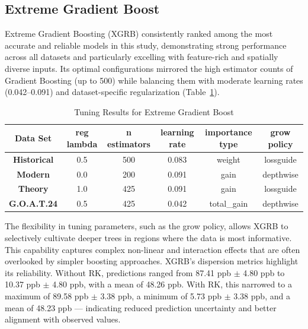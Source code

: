 \subsection{Extreme Gradient Boost} \label{rlts:xgrb} Extreme Gradient Boosting (XGRB) consistently ranked among the most accurate and reliable models in this study, demonstrating strong performance across all datasets and particularly excelling with feature-rich and spatially diverse inputs. Its optimal configurations mirrored the high estimator counts of Gradient Boosting (up to 500) while balancing them with moderate learning rates (0.042–0.091) and dataset-specific regularization (Table~\ref{tab:xgrb_model}). \begin{table}[h!]
    \centering
        \begin{tabular}{||c|ccccc||}
            \hline 
            \textbf{Data Set} & reg lambda & n estimators & learning rate & importance type & grow policy \\
            \hline \hline
            \textbf{Historical} & 0.5 & 500 & 0.083 & weight & lossguide \\[3pt] 
            \textbf{Modern}	 & 0.0 & 200 & 0.091 & gain & depthwise \\[3pt]
            \textbf{Theory}  & 1.0 & 425 & 0.091 & gain & lossguide \\[3pt]
            \textbf{G.O.A.T.24} & 0.5 & 425 & 0.042 & total_gain & depthwise \\ 
            \hline
        \end{tabular}
    \caption{Tuning Results for Extreme Gradient Boost} 
    \label{tab:xgrb_model}
\end{table} The flexibility in tuning parameters, such as the grow policy, allows XGRB to selectively cultivate deeper trees in regions where the data is most informative. This capability captures complex non-linear and interaction effects that are often overlooked by simpler boosting approaches. XGRB's dispersion metrics highlight its reliability. Without RK, predictions ranged from 87.41 ppb $\pm$ 4.80 ppb to 10.37 ppb $\pm$ 4.80 ppb, with a mean of 48.26 ppb. With RK, this narrowed to a maximum of 89.58 ppb $\pm$ 3.38 ppb, a minimum of 5.73 ppb $\pm$ 3.38 ppb, and a mean of 48.23 ppb — indicating reduced prediction uncertainty and better alignment with observed values. 

